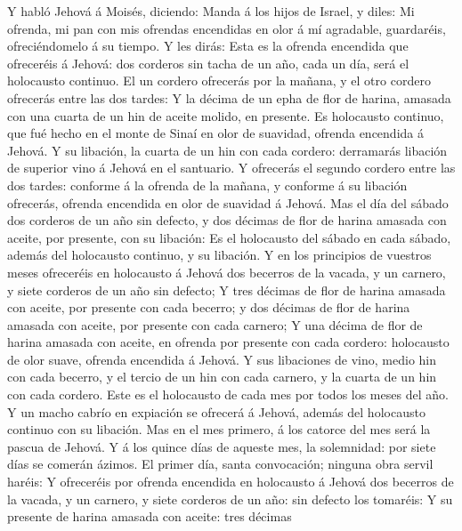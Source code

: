  Y habló Jehová á Moisés, diciendo:  Manda á
los hijos de Israel, y diles: Mi ofrenda, mi pan con mis ofrendas
encendidas en olor á mí agradable, guardaréis, ofreciéndomelo á su
tiempo.  Y les dirás: Esta es la ofrenda encendida que
ofreceréis á Jehová: dos corderos sin tacha de un año, cada un día, será
el holocausto continuo.  El un cordero ofrecerás por la
mañana, y el otro cordero ofrecerás entre las dos tardes: 
Y la décima de un epha de flor de harina, amasada con una cuarta de un
hin de aceite molido, en presente.  Es holocausto
continuo, que fué hecho en el monte de Sinaí en olor de suavidad,
ofrenda encendida á Jehová.  Y su libación, la cuarta de
un hin con cada cordero: derramarás libación de superior vino á Jehová
en el santuario.  Y ofrecerás el segundo cordero entre las
dos tardes: conforme á la ofrenda de la mañana, y conforme á su libación
ofrecerás, ofrenda encendida en olor de suavidad á Jehová.
 Mas el día del sábado dos corderos de un año sin defecto,
y dos décimas de flor de harina amasada con aceite, por presente, con su
libación:  Es el holocausto del sábado en cada sábado,
además del holocausto continuo, y su libación.  Y en los
principios de vuestros meses ofreceréis en holocausto á Jehová dos
becerros de la vacada, y un carnero, y siete corderos de un año sin
defecto;  Y tres décimas de flor de harina amasada con
aceite, por presente con cada becerro; y dos décimas de flor de harina
amasada con aceite, por presente con cada carnero;  Y una
décima de flor de harina amasada con aceite, en ofrenda por presente con
cada cordero: holocausto de olor suave, ofrenda encendida á Jehová.
 Y sus libaciones de vino, medio hin con cada becerro, y
el tercio de un hin con cada carnero, y la cuarta de un hin con cada
cordero. Este es el holocausto de cada mes por todos los meses del año.
 Y un macho cabrío en expiación se ofrecerá á Jehová,
además del holocausto continuo con su libación.  Mas en
el mes primero, á los catorce del mes será la pascua de Jehová.
 Y á los quince días de aqueste mes, la solemnidad: por
siete días se comerán ázimos.  El primer día, santa
convocación; ninguna obra servil haréis:  Y ofreceréis
por ofrenda encendida en holocausto á Jehová dos becerros de la vacada,
y un carnero, y siete corderos de un año: sin defecto los tomaréis:
 Y su presente de harina amasada con aceite: tres décimas
